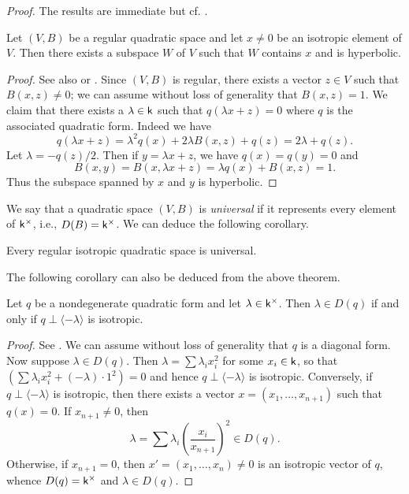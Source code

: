 \emph{Proof.} The results are immediate but cf. \cite[pp.~12--13]{lam1973quadratic}.

\begin{theoremx}\label{thm:hyperbolic-decomp}
    Let \((V,B)\) be a regular quadratic space and let \(x \neq 0\) be an isotropic element of \(V\). Then there exists a subspace \(W\) of \(V\) such that \(W\) contains \(x\) and is hyperbolic.
\end{theoremx}

\begin{proof}
    See also \cite[p.~13]{clarkquadratic} or \cite[p.~29]{serre2012course}. Since \((V,B)\) is regular, there exists a vector \(z \in V\) such that \(B(x,z) \neq 0\); we can assume without loss of generality that \(B(x,z) = 1\). We claim that there exists a \(\lambda \in \mathsf{k}\) such that \(q(\lambda x + z) = 0\) where \(q\) is the associated quadratic form. Indeed we have
    \[
        q(\lambda x + z) = \lambda^2q(x) + 2\lambda B(x,z) + q(z) = 2\lambda + q(z).     
    \]
    Let \(\lambda = -q(z)/2\). Then if \(y = \lambda x + z\), we have \(q(x) = q(y) = 0\) and
    \[
        B(x,y) = B(x, \lambda x + z) = \lambda q(x) + B(x,z) = 1.
    \]
    Thus the subspace spanned by \(x\) and \(y\) is hyperbolic.
\end{proof}

\medskip


We say that a quadratic space \((V,B)\) is \emph{universal} if it represents every element of \(\mathsf{k}^{\times}\), i.e., \(D(B) = \mathsf{k}^{\times}\).  We can deduce the following corollary.

\begin{corollaryx}\label{cor:regular-isotropic}
    Every regular isotropic quadratic space is universal.
\end{corollaryx}

The following corollary can also be deduced from the above theorem.

\begin{corollaryx}\label{cor:rep-theorem-1}
    Let \(q\) be a nondegenerate quadratic form and let \(\lambda \in \mathsf{k}^{\times}\). Then \(\lambda \in D(q)\) if and only if \(q \perp \langle -\lambda \rangle\) is isotropic.
\end{corollaryx}

\begin{proof}
    See \cite[pp.~14--15]{lam1973quadratic}. We can assume without loss of generality that \(q\) is a diagonal form. Now suppose \(\lambda \in D(q)\). Then \(\lambda = \sum \lambda_i x_i^2\) for some \(x_i \in \mathsf{k}\), so that \(\left(\sum \lambda_ix_i^2 + (-\lambda) \cdot 1^2 \right) = 0\) and hence \(q \perp \langle -\lambda \rangle\) is isotropic. Conversely, if \(q \perp \langle -\lambda \rangle\) is isotropic, then there exists a vector \(x = (x_1, \dots, x_{n+1})\) such that \(q(x) = 0\). If \(x_{n+1} \neq 0\), then
    \[
        \lambda = \sum \lambda_i\left(\frac{x_i}{x_{n+1}}\right)^2 \in D(q).
    \]
    Otherwise, if \(x_{n+1} = 0\), then \(x' = (x_1, \dots, x_n) \neq 0\) is an isotropic vector of \(q\), whence \(D(q) = \mathsf{k}^{\times}\) and \(\lambda \in D(q)\).
\end{proof}

